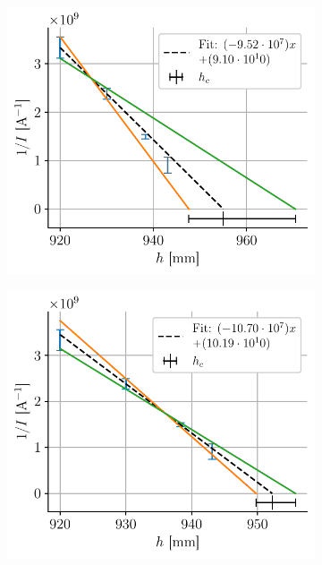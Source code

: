 \begin{figure}[H]
    \centering
    \begin{subfigure}{0.48\linewidth}
        \centering
        \includegraphics[width=\linewidth]{figures/h_I_pair12.pdf}
        \caption{}
        \label{fig:hc_I_12}
    \end{subfigure}
    \begin{subfigure}{0.48\linewidth}
        \centering
        \includegraphics[width=\linewidth]{figures/h_I_pair23.pdf}

\end{subfigure}
\end{figure}
